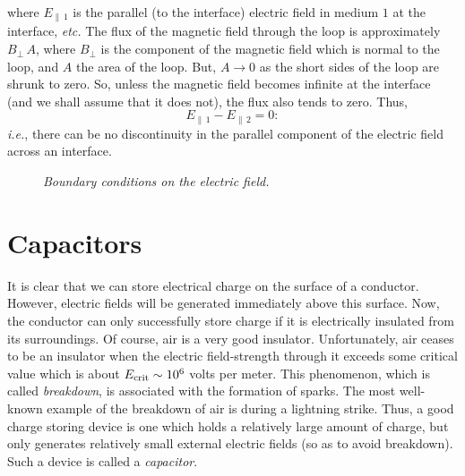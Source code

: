 where
$E_{\parallel\,1}$ is the parallel (to the interface) electric field in
medium $1$ at the interface, {\em etc.} The flux of the magnetic field through the
loop is approximately $B_\perp\,A$, where $B_\perp$ is the component of the
magnetic field which is normal to the loop, and $A$ the area of the loop.
But, $A\rightarrow 0$ as the short sides of the loop are shrunk to zero. So,
unless the magnetic field becomes infinite at the interface (and we shall assume that it does not), the
flux also tends to zero. Thus,
\begin{equation}
E_{\parallel\,1} - E_{\parallel\,2}=0:
\end{equation}
{\em i.e.}, there can be no discontinuity in the parallel
component of the  electric field across an interface.
\begin{figure}
\epsfysize=1.5in
\centerline{}
\caption{\em Boundary conditions on the electric field.}\label{f43}
\end{figure}


\section{Capacitors}\label{scap}
It is clear that we can store electrical 
charge on the surface of a conductor. However,
electric fields will be generated immediately above this surface.
Now, the conductor can only successfully store charge if it is electrically insulated
from its surroundings. Of course, air is a very good insulator. Unfortunately, air
ceases to be an insulator when the electric field-strength through it exceeds some
critical value which is about $E_{\rm crit} \sim 10^6$ volts per meter. This
phenomenon, which is called {\em breakdown}, is associated with the formation
of sparks. The most well-known example of the breakdown of 
air is during a lightning
strike. Thus, a good charge storing device is one which holds a relatively large amount
of charge, but only generates relatively small external electric fields (so as to avoid breakdown). Such a device is called
a {\em capacitor}.

